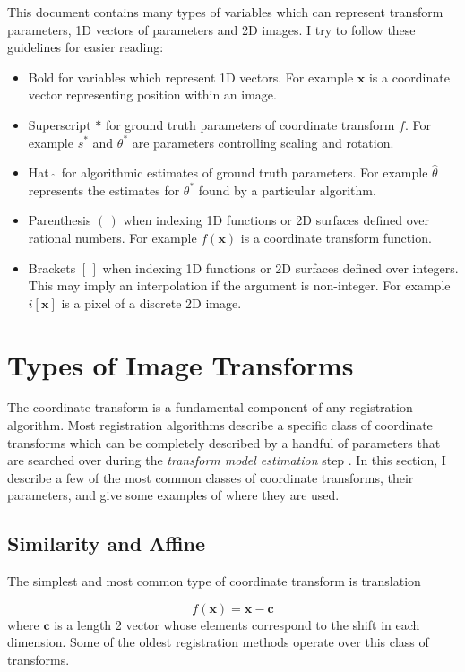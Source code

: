 \documentclass[tocnosub,noragright,centerchapter,12pt]{uiucecethesis09}
\begin{document}
This document contains many types of variables which can represent transform parameters, 1D vectors of parameters and 2D images.   I try to follow these guidelines for easier reading:

\begin{itemize}
    \item Bold for variables which represent 1D vectors.  For example $\bm{x}$ is a coordinate vector representing position within an image.
    \item Superscript $*$ for ground truth parameters of coordinate transform $f$.  For example $s^*$ and $\theta^*$ are parameters controlling scaling and rotation.
    \item Hat $\,\hat{}\,$ for algorithmic estimates of ground truth parameters. For example $\hat{\theta}$ represents the estimates for $\theta^*$ found by a particular algorithm.
    \item Parenthesis $(\,)$ when indexing 1D functions or 2D surfaces defined over rational numbers.  For example $f(\bm{x})$ is a coordinate transform function.
    \item Brackets $[\,]$ when indexing 1D functions or 2D surfaces defined over integers.  This may imply an interpolation if the argument is non-integer.  For example $i[\bm{x}]$ is a pixel of a discrete 2D image.
\end{itemize}

\section{Types of Image Transforms}

The coordinate transform is a fundamental component of any registration algorithm.  Most registration algorithms describe a specific class of coordinate transforms which can be completely described by a handful of parameters that are searched over during the \emph{transform model estimation} step .  In this section, I describe a few of the most common classes of coordinate transforms, their parameters, and give some examples of where they are used.

\subsection{Similarity and Affine}

The simplest and most common type of coordinate transform is translation

$$f(\bm{x}) = \bm{x} - \bm{c}$$
where $\bm{c}$ is a length 2 vector whose elements correspond to the shift in each dimension.  Some of the oldest registration methods operate over this class of transforms. 
\end{document}
